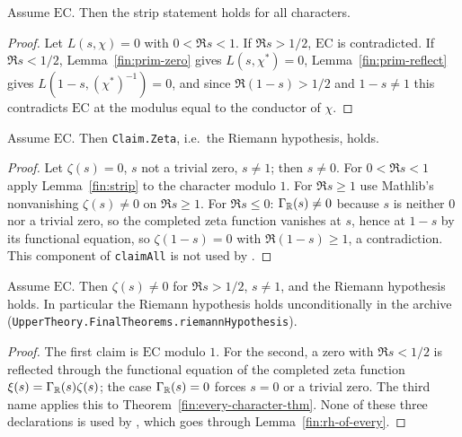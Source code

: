 \begin{lemma}\label{fin:strip}
Assume $\mathrm{EC}$. Then the strip statement holds for all characters.
\end{lemma}
\begin{proof}
Let $L(s,\chi)=0$ with $0<\Re s<1$. If $\Re s>1/2$, $\mathrm{EC}$ is
contradicted. If $\Re s<1/2$, Lemma~\ref{fin:prim-zero} gives
$L(s,\chi^{\ast})=0$, Lemma~\ref{fin:prim-reflect} gives
$L(1-s,(\chi^{\ast})^{-1})=0$, and since $\Re(1-s)>1/2$ and $1-s\ne1$ this
contradicts $\mathrm{EC}$ at the modulus equal to the conductor of $\chi$.
\end{proof}

\begin{lemma}\label{fin:zeta}
Assume $\mathrm{EC}$. Then \texttt{Claim.Zeta}, i.e.\ the Riemann hypothesis,
holds.
\end{lemma}
\begin{proof}
Let $\zeta(s)=0$, $s$ not a trivial zero, $s\ne1$; then $s\ne0$. For
$0<\Re s<1$ apply Lemma~\ref{fin:strip} to the character modulo $1$. For
$\Re s\ge1$ use Mathlib's nonvanishing $\zeta(s)\ne0$ on $\Re s\ge1$. For
$\Re s\le0$: $\Gamma_{\mathbb{R}}(s)\ne0$ because $s$ is neither $0$ nor a trivial zero,
so the completed zeta function vanishes at $s$, hence at $1-s$ by its functional
equation, so $\zeta(1-s)=0$ with $\Re(1-s)\ge1$, a contradiction. This
component of \texttt{claimAll} is not used by .
\end{proof}

\begin{lemma}\label{fin:rh-of-everychar}
Assume $\mathrm{EC}$. Then $\zeta(s)\ne0$ for $\Re s>1/2$, $s\ne1$, and the
Riemann hypothesis holds. In particular the Riemann hypothesis holds
unconditionally in the archive (\texttt{UpperTheory.FinalTheorems.riemannHypothesis}).
\end{lemma}
\begin{proof}
The first claim is $\mathrm{EC}$ modulo $1$. For the second, a zero with
$\Re s<1/2$ is reflected through the functional equation of the completed zeta
function $\xi(s)=\Gamma_{\mathbb{R}}(s)\zeta(s)$; the case $\Gamma_{\mathbb{R}}(s)=0$ forces $s=0$
or a trivial zero. The third name applies this to
Theorem~\ref{fin:every-character-thm}. None of these three declarations is used
by , which goes through Lemma~\ref{fin:rh-of-every}.
\end{proof}

